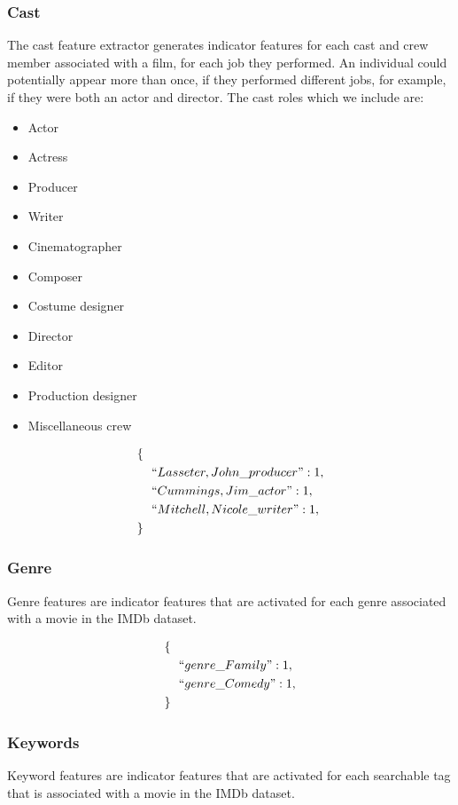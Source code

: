 \documentclass[journal]{IEEEtran}
\begin{document}
\subsubsection{Cast}
The cast feature extractor generates indicator features for each
cast and crew member associated with a film, for each job they 
performed.  An individual could potentially appear more than once,
if they performed different jobs, for example, if they were both
an actor and director.  The cast roles which we include are:
\begin{itemize}
	\item Actor
	\item Actress
	\item Producer
	\item Writer
	\item Cinematographer
	\item Composer
	\item Costume designer
	\item Director
	\item Editor
	\item Production designer
	\item Miscellaneous crew
\end{itemize}

\begin{align*}
        \{ \ \ & \\
        &``Lasseter,John\_producer": 1,\\
        &``Cummings,Jim\_actor": 1,\\
        &``Mitchell,Nicole\_writer": 1,\\
        \} \ \ &
\end{align*}

\subsubsection{Genre}
Genre features are indicator features that are activated for each
genre associated with a movie in the IMDb dataset.

\begin{align*}
        \{\ \ &\\
        &``genre\_Family": 1,\\
        &``genre\_Comedy": 1,\\
        \}\ \ &
\end{align*}

\subsubsection{Keywords}
Keyword features are indicator features that are activated for
each searchable tag that is associated with a movie in the
IMDb dataset.
\end{document}
